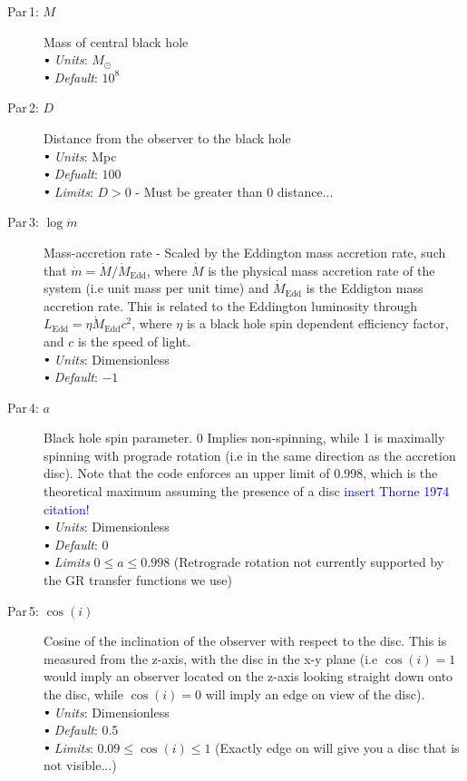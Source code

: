\documentclass[a4paper, 11pt, times, onecolumn]{article}
\newcommand{\Msol}{M_{\odot}}
\newcommand{\mdot}{\dot{m}}
\newcommand{\Mdot}{\dot{M}}
\newcommand{\Mdedd}{\dot{M}_{\mathrm{Edd}}}
\newcommand{\Ledd}{L_{\mathrm{Edd}}}
\newcommand{\sbt}{\,\begin{picture}(-1,1)(-1,-3)\circle*{3}\end{picture}\ }
\begin{document}
\begin{description}
	\item[Par\,1:\,\,$M$] Mass of central black hole \\
		$\sbt$ {\it Units}: $\Msol$ \\
		$\sbt$ {\it Default}: $10^{8}$ \\

	
	\item[Par\,2:\,\,$D$]  Distance from the observer to the black hole \\
		$\sbt$ {\it Units}: Mpc \\
		$\sbt$ {\it Defualt}: $100$ \\
		$\sbt$ {\it Limits}: $D>0$ - Must be greater than 0 distance...
	
	\item[Par\,3:\,\,$\log \mdot$] Mass-accretion rate - Scaled by the Eddington mass accretion rate, such that $\mdot = \Mdot/\Mdedd$, where $\Mdot$ is the physical mass accretion rate of the system (i.e unit mass per unit time) and $\Mdedd$ is the Eddigton mass accretion rate. This is related to the Eddington luminosity through $\Ledd = \eta \Mdedd c^{2}$, where $\eta$ is a black hole spin dependent efficiency factor, and $c$ is the speed of light. \\
		$\sbt$ {\it Units}: Dimensionless \\
		$\sbt$ {\it Default}: $-1$ \\
	
	\item[Par\,4:\,\,$a$] Black hole spin parameter. 0 Implies non-spinning, while 1 is maximally spinning with prograde rotation (i.e in the same direction as the accretion disc). Note that the code enforces an upper limit of 0.998, which is the theoretical maximum assuming the presence of a disc \textcolor{blue}{insert Thorne 1974 citation!} \\
		$\sbt$ {\it Units}: Dimensionless \\
		$\sbt$ {\it Default}: $0$ \\
		$\sbt$ {\it Limits} $0 \leq a \leq 0.998$ (Retrograde rotation not currently supported by the GR transfer functions we use)
	
	\item[Par\,5:\,\,$\cos(i)$] Cosine of the inclination of the observer with respect to the disc. This is measured from the z-axis, with the disc in the x-y plane (i.e $\cos(i) = 1$ would imply an observer located on the z-axis looking straight down onto the disc, while $\cos(i) = 0$ will imply an edge on view of the disc). \\
		$\sbt$ {\it Units}: Dimensionless \\
		$\sbt$ {\it Default}: 0.5 \\
		$\sbt$ {\it Limits}: $0.09 \leq \cos(i) \leq 1$ (Exactly edge on will give you a disc that is not visible...) 
	

\end{description}
\end{document}
